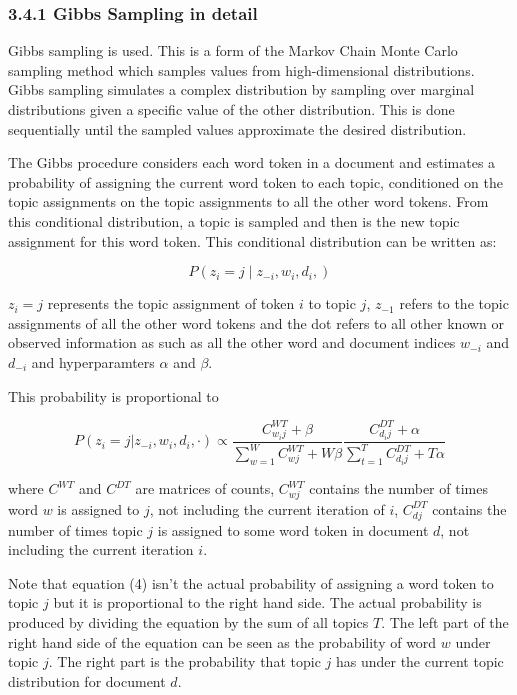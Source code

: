 \documentclass[
]{article}
\begin{document}
\hypertarget{gibbs-sampling-in-detail}{%
\subsubsection{3.4.1 Gibbs Sampling in
detail}\label{gibbs-sampling-in-detail}}

Gibbs sampling is used. This is a form of the Markov Chain Monte Carlo
sampling method which samples values from high-dimensional
distributions. Gibbs sampling simulates a complex distribution by
sampling over marginal distributions given a specific value of the other
distribution. This is done sequentially until the sampled values
approximate the desired distribution.

The Gibbs procedure considers each word token in a document and
estimates a probability of assigning the current word token to each
topic, conditioned on the topic assignments on the topic assignments to
all the other word tokens. From this conditional distribution, a topic
is sampled and then is the new topic assignment for this word token.
This conditional distribution can be written as:

\begin{equation}
P(z_i=j \mid z_{-i}, w_i, d_i,)
\end{equation}

\(z_i=j\) represents the topic assignment of token \(i\) to topic \(j\),
\(z_{-1}\) refers to the topic assignments of all the other word tokens
and the dot refers to all other known or observed information as such as
all the other word and document indices \(w_{-i}\) and \(d_{-i}\) and
hyperparamters \(\alpha\) and \(\beta\).

This probability is proportional to

\begin{equation}
P(z_i = j | z_{-i}, w_i, d_i, \cdot) \propto \frac{C^{WT}_{w_ij} + \beta}{\sum_{w=1}^{W}C^{WT}_{wj} + W\beta}\frac{C^{DT}_{d_ij} + \alpha}{\sum_{t=1}^{T}C^{DT}_{d_ij} + T\alpha}
\end{equation}

where \(C^{WT}\) and \(C^{DT}\) are matrices of counts, \(C^{WT}_{wj}\)
contains the number of times word \(w\) is assigned to \(j\), not
including the current iteration of \(i\), \(C^{DT}_{dj}\) contains the
number of times topic \(j\) is assigned to some word token in document
\(d\), not including the current iteration \(i\).

Note that equation (4) isn't the actual probability of assigning a word
token to topic \(j\) but it is proportional to the right hand side. The
actual probability is produced by dividing the equation by the sum of
all topics \(T\). The left part of the right hand side of the equation
can be seen as the probability of word \(w\) under topic \(j\). The
right part is the probability that topic \(j\) has under the current
topic distribution for document \(d\).
\end{document}
